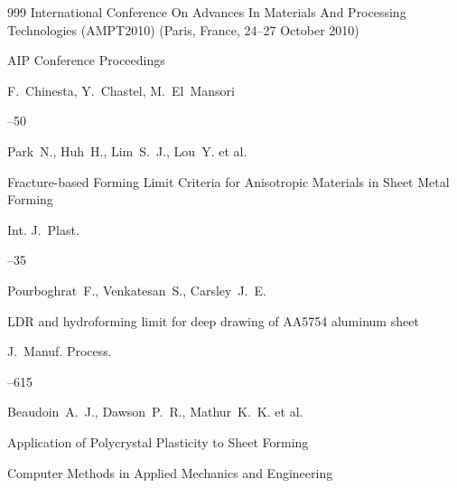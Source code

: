 \begin{thebibliography}{999}
\inbook International Conference On Advances In Materials And Processing Technologies (AMPT2010) \rm (Paris, France, 24–27 October 2010)

\serial AIP Conference Proceedings

\ed F.~Chinesta, Y.~Chastel, M.~El~Mansori




--50






\by Park~N., Huh~H., Lim~S.~J., Lou~Y. et al.

\paper Fracture-based Forming Limit Criteria for Anisotropic Materials in Sheet Metal Forming

\jour Int. J.~Plast. 



--35






\by Pourboghrat~F., Venkatesan~S., Carsley~J.~E. 

\paper LDR and hydroforming limit for deep drawing of AA5754 aluminum sheet

\jour J.~Manuf. Process.




--615






\by Beaudoin~A.~J., Dawson~P.~R., Mathur~K.~K. et al.

\paper Application of Polycrystal Plasticity to Sheet Forming

\jour Computer Methods in Applied Mechanics and Engineering




\end{thebibliography}
